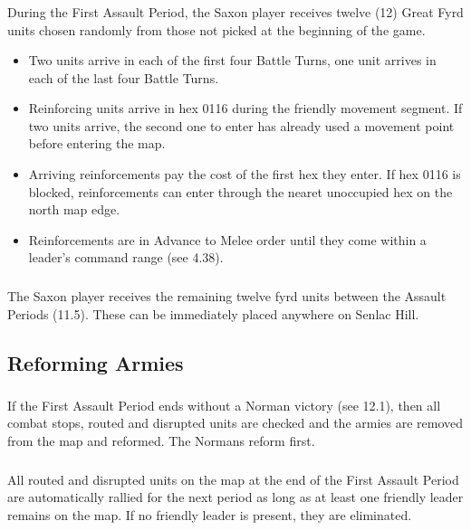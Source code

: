 \subsubsection[First Assault Period]{} During the First Assault Period, the Saxon player receives twelve (12) Great Fyrd units chosen randomly from those not picked at the beginning of the game.

\begin{itemize}
  \item Two units arrive in each of the first four Battle Turns, one unit arrives in each of the last four Battle Turns.
  \item Reinforcing units arrive in hex 0116 during the friendly movement segment. If two units arrive, the second one to enter has already used a movement point before entering the map.
  \item Arriving reinforcements pay the cost of the first hex they enter. If hex 0116 is blocked, reinforcements can enter through the nearet unoccupied hex on the north map edge.
  \item Reinforcements are in Advance to Melee order until they come within a leader's command range (see 4.38).
\end{itemize}

\subsubsection[Remaining Units]{} The Saxon player receives the remaining twelve fyrd units between the Assault Periods (11.5). These can be immediately placed anywhere on Senlac Hill.

\subsection{Reforming Armies}

\subsubsection[First Assault Period]{} If the First Assault Period ends without a Norman victory (see 12.1), then all combat stops, routed and disrupted units are checked and the armies are removed from the map and reformed. The Normans reform first.

\subsubsection[Routed and Disrupted Units]{} All routed and disrupted units on the map at the end of the First Assault Period are automatically rallied for the next period as long as at least one friendly leader remains on the map. If no friendly leader is present, they are eliminated.

